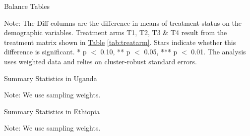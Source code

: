 \documentclass[a4paper,12pt]{article}
\renewcommand{\footnotesize}{\fontsize{8pt}{9pt}\selectfont}
\begin{document}
\begin{appendix}
\vspace{5mm}


\begin{table}[H]\centering
	\scriptsize
	\caption{Balance Tables}
	\label{tab:balance-tab}
	\begin{adjustwidth}{-1.5cm}{}
		\begin{threeparttable}
		
	\begin{tablenotes}
		\footnotesize
		\item Note:  The Diff columns are the difference-in-means of treatment status on the demographic variables. Treatment arms T1, T2, T3 \& T4 result from the treatment matrix shown in \hyperref[tab:treatarm]{Table} \ref{tab:treatarm}. Stars indicate whether this difference is significant. * p $<$ 0.10, ** p $<$ 0.05, *** p $<$ 0.01. The analysis uses weighted data and relies on cluster-robust standard errors.
	\end{tablenotes}
	\end{threeparttable}
	\end{adjustwidth}
\end{table}

\vspace{10mm}
 \begin{table}[H]
 	\footnotesize
 	\caption{Summary Statistics in Uganda}
 	\label{tab:sumstat_byR_uga}
 	\begin{adjustwidth}{-1cm}{}
 		\centering
 		\begin{threeparttable}
		
	 \begin{tablenotes}
	 	\footnotesize
	 	\item Note: We use sampling weights. 
	 \end{tablenotes}
	 \end{threeparttable}
	\end{adjustwidth}
\end{table} 


\begin{table}[H]
	\footnotesize
	\caption{Summary Statistics in Ethiopia}
	\label{tab:sumstat_byR_eth}
	\begin{adjustwidth}{-1cm}{}
		\centering
		\begin{threeparttable}
		
		\begin{tablenotes}
			\footnotesize
			\item Note: We use sampling weights. 
		\end{tablenotes}
		\end{threeparttable}
	\end{adjustwidth}
\end{table}



\end{appendix}
\end{document}
